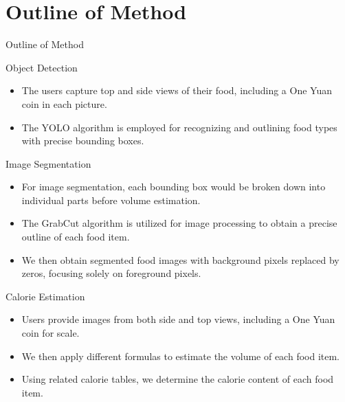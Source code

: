 \documentclass{beamer}
\begin{document}
	\section{Outline of Method}
	\begin{frame}{Outline of Method}
		\begin{block}{Object Detection}\scriptsize
			\begin{itemize}
				\item The users capture top and side views of their food, including a One Yuan coin in each picture.
				\item The YOLO algorithm\cite{yolo} is employed for recognizing and outlining food types with precise bounding boxes.
			\end{itemize}
		\end{block}\pause
		\begin{block}{Image Segmentation}\scriptsize
			\begin{itemize}
				\item For image segmentation, each bounding box would be broken down into individual parts before volume estimation.
				\item The GrabCut algorithm\cite{grabcut} is utilized for image processing to obtain a precise outline of each food item. \item We then obtain segmented food images with background pixels replaced by zeros, focusing solely on foreground pixels.
			\end{itemize}
		\end{block}\pause
		\begin{block}{Calorie Estimation}\scriptsize
			\begin{itemize}
				\item Users provide images from both side and top views, including a One Yuan coin for scale.
				\item We then apply different formulas to estimate the volume of each food item.
				\item Using related calorie tables, we determine the calorie content of each food item.
			\end{itemize}
		\end{block}
	\end{frame}
	
\end{document}
